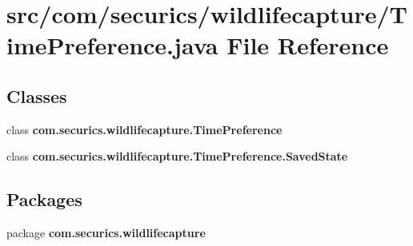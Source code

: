 \section{src/com/securics/wildlifecapture/\+Time\+Preference.java File Reference}
\label{_time_preference_8java}
\subsection*{Classes}
\begin{DoxyCompactItemize}
\item 
class {\bf com.\+securics.\+wildlifecapture.\+Time\+Preference}
\item 
class {\bfseries com.\+securics.\+wildlifecapture.\+Time\+Preference.\+Saved\+State}
\end{DoxyCompactItemize}
\subsection*{Packages}
\begin{DoxyCompactItemize}
\item 
package {\bf com.\+securics.\+wildlifecapture}
\end{DoxyCompactItemize}
